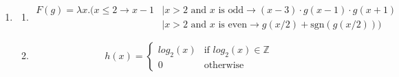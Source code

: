 \documentclass{article}
\begin{document}
\begin{enumerate}
    \item %
    \begin{enumerate}
        \item %
        \begin{equation}
            \begin{aligned}
                F(g) = \lambda x.( x \leq 2 \rightarrow x - 1
                    & \mid x > 2 \text{ and } x \text{ is odd} \rightarrow (x - 3) \cdot g(x - 1) \cdot g(x + 1) \\
                    & \mid x > 2 \text{ and } x \text{ is even} \rightarrow g(x/2) + \text{sgn}(g(x/2)))
            \end{aligned}
        \end{equation}

        \item %
        \begin{equation}
            h(x) =
            \begin{cases}
                log_2(x) & \text{if } log_2(x) \in \mathbb{Z} \\
                0 & \text{otherwise}
            \end{cases}
        \end{equation}


\end{enumerate}
\end{enumerate}
\end{document}

